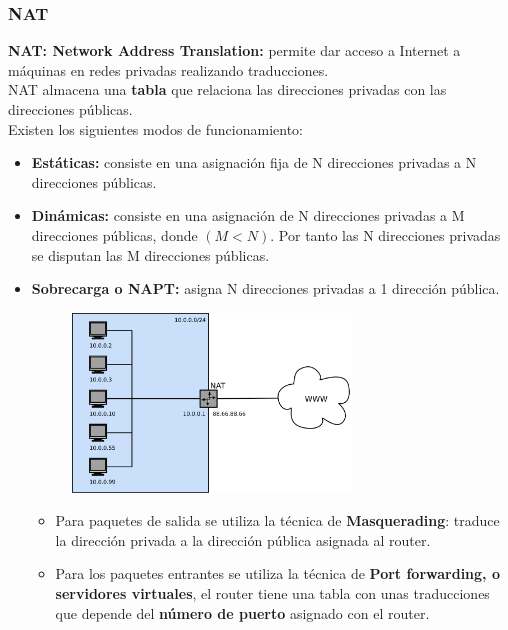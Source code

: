 \begin{onepage}
    \subsubsection{NAT}
    \textbf{NAT: Network Address Translation:} permite dar acceso a Internet a máquinas en redes privadas realizando traducciones.\\
    
    NAT almacena una \textbf{tabla} que relaciona las direcciones privadas con las direcciones públicas.\\
    
    Existen los siguientes modos de funcionamiento:
    \begin{itemize}
        \item \textbf{Estáticas: }consiste en una asignación fija de N direcciones privadas a N direcciones públicas.
        \item \textbf{Dinámicas: }consiste en una asignación de N direcciones privadas a M direcciones públicas, donde $(M < N)$. Por tanto las N direcciones privadas se disputan las M direcciones públicas.
        \item \textbf{Sobrecarga o NAPT: }asigna N direcciones privadas a 1 dirección pública.
        \begin{figure}[H]\centering\includegraphics[width=0.7\textwidth]{img/NAT.png}\end{figure}
        \begin{itemize}
            \item Para paquetes de salida se utiliza la técnica de \textbf{Masquerading}: traduce la dirección privada a la dirección pública asignada al router. 
            \item Para los paquetes entrantes se utiliza la técnica de \textbf{Port forwarding, o servidores virtuales}, el router tiene una tabla con unas traducciones que depende del \textbf{número de puerto} asignado con el router.
        \end{itemize}
    \end{itemize}
\end{onepage}

